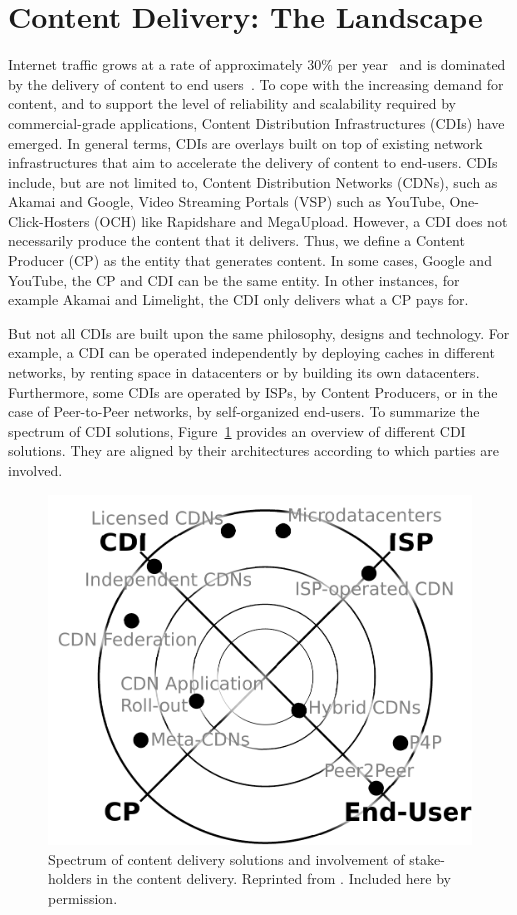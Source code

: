 \section{Content Delivery: The Landscape}\label{sec:content-delivery}

Internet traffic grows at a rate of approximately 30\% per
year~\cite{cisco-study} and is dominated by the delivery of content to end
users~\cite{IXPSIGCOMM2012,TrafficTypesGrowth:2011,arbor,PADIS2010}. To cope
with the increasing demand for content, and to support the level of reliability
and scalability required by commercial-grade applications, Content Distribution
Infrastructures (CDIs) have emerged. In general terms, CDIs are overlays built
on top of existing network infrastructures that aim to accelerate the delivery
of content to end-users. CDIs include, but are not limited to, Content
Distribution Networks (CDNs), such as Akamai and Google, Video Streaming
Portals (VSP) such as YouTube, One-Click-Hosters (OCH) like Rapidshare and
MegaUpload. However, a CDI does not necessarily produce the content that it
delivers. Thus, we define a Content Producer (CP) as the entity that generates
content. In some cases, \eg Google and YouTube, the CP and CDI can be the same
entity. In other instances, for example Akamai and Limelight, the CDI only
delivers what a CP pays for.

But not all CDIs are built upon the same philosophy, designs and technology.
For example, a CDI can be operated independently by deploying caches in
different networks, by renting space in datacenters or by building its own
datacenters. Furthermore, some CDIs are operated by ISPs, by Content Producers,
or in the case of Peer-to-Peer networks, by self-organized end-users. To
summarize the spectrum of CDI solutions, Figure~\ref{fig:cdn-spectrum} provides
an overview of different CDI solutions. They are aligned by their architectures
according to which parties are involved.

\begin{figure}[tbp]
    \begin{center}
    \includegraphics[width=0.7\linewidth]{figures-pdf/spectrum}
    \end{center}
    \caption{Spectrum of content delivery solutions and involvement of
      stake-holders in the content delivery. Reprinted from
      \cite{NetPaaS}. Included here by permission.}
    \label{fig:cdn-spectrum}
\end{figure}

